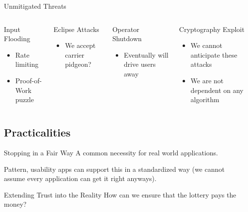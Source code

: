 \begin{frame}{Unmitigated Threats}
    \begin{columns}[T,onlytextwidth]

        \begin{block}{Input Flooding}
          \begin{itemize}
              \item Rate limiting
              \item Proof-of-Work puzzle
          \end{itemize}
        \end{block}

        \begin{block}{Eclipse Attacks}
            \begin{itemize}
                \item We accept carrier pidgeon?
            \end{itemize}
        \end{block}


        \begin{block}{Operator Shutdown}
            \begin{itemize}
                \item Eventually will drive users away
            \end{itemize}
        \end{block}

        \begin{block}{Cryptography Exploit}
            \begin{itemize}
                \item We cannot anticipate these attacks
                \item We are not dependent on any algorithm
            \end{itemize}
        \end{block}

      \end{columns}
\end{frame}

\subsection{Practicalities}

\begin{frame}{Stopping in a Fair Way}
    A common necessity for real world applications.

    Pattern, usability apps can support this in a standardized way (we cannot assume every application can get it right anyways).
\end{frame}

\begin{frame}{Extending Trust into the Reality}
    \centering
    How can we ensure that the lottery pays the money?
\end{frame}
